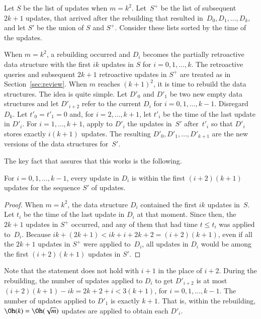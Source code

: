 \documentclass[3p,times,procedia]{elsarticle}
\begin{document}
Let $S$ be the list of updates when $m=k^2$. 
Let~$S^+$ be the list of subsequent $2k+1$ updates, 
that arrived after the rebuilding that resulted in~$D_0,D_1,\ldots,D_k$,
and let $S'$ be the union of $S$ and $S^+$.  
Consider these lists sorted by the time of the updates. 

When $m=k^2$, a rebuilding occurred and $D_i$ becomes the partially retroactive 
data structure with the first $ik$ updates in $S$ for $i=0,1,\ldots,k$. 
The retroactive queries and subsequent $2k+1$ retroactive updates in $S^+$ 
are treated as in Section~\ref{sec:review}. 
When $m$ reaches $(k+1)^2$, it is time to rebuild the data structures.  
The idea is quite simple.  Let $D'_0$ and $D'_1$ be two new empty data structures 
and let $D'_{i+2}$ refer to the current $D_i$ for $i=0,1,\ldots,k-1$.  Disregard $D_k$.   
Let $t'_0 = t'_1 = 0$ and, for $i=2,\ldots,k+1$, 
let $t'_i$ be the time of the last update in $D'_i$.
For $i=1,\ldots,k+1$, apply to $D'_i$ the updates in~$S'$ 
after~$t'_i$ so that $D'_i$ stores exactly $i(k+1)$ updates.
The resulting $D'_0,D'_1,\ldots,D'_{k+1}$ are the new versions of the data structures for~$S'$. 

\medskip 

The key fact that assures that this works is the following. 

\begin{lemma}
  For $i=0,1,\ldots,k-1$, every update in $D_i$ is within 
  the first $(i+2)(k+1)$ updates for the sequence $S'$ of updates. 
\end{lemma}

\begin{proof}
  When $m=k^2$, the data structure $D_i$ contained the first $ik$ updates in~$S$. 
  Let $t_i$ be the time of the last update in $D_i$ at that moment.
  Since then, the $2k+1$ updates in $S^+$ occurred, 
  and any of them that had time $t \leq t_i$ was applied to~$D_i$. 
  Because $ik+(2k+1) < ik+i+2k+2 = (i+2)(k+1)$, 
  even if all the $2k+1$ updates in $S^+$ were applied to~$D_i$,
  all updates in $D_i$ would be among the first $(i+2)(k+1)$ updates in $S'$. 
\end{proof}

Note that the statement does not hold with $i+1$ in the place of $i+2$. 
During the rebuilding, the number of updates applied to $D_i$ to get $D'_{i+2}$ 
is at most $(i+2)(k+1)-ik = 2k+2+i < 3(k+1)$, for $i=0,1,\ldots,k-1$.  
The number of updates applied to $D'_1$ is exactly $k+1$.  That is, within the 
rebuilding, $\Oh(k) = \Oh(\sqrt{m})$ updates are applied to obtain each $D'_i$.
\end{document}

